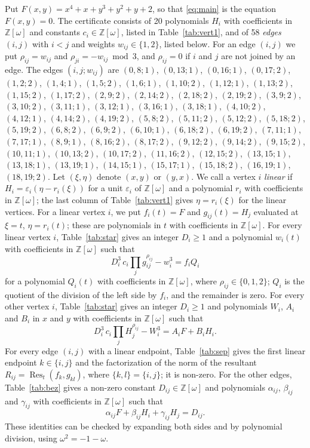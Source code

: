 \documentclass[11pt]{article}
\newcommand{\Z}{\mathbb{Z}}
\begin{document}
Put $F(x,y)=x^{4}+x+y^{3}+y^{2}+y+2$, so that \eqref{eq:main} is the equation $F(x,y)=0$. The certificate consists of 20 polynomials $H_i$ with coefficients in $\Z[\omega]$ and constants $c_i\in\Z[\omega]$, listed in Table~\ref{tab:vert1}, and of 58 \emph{edges} $(i,j)$ with $i<j$ and weights $w_{ij}\in\{1,2\}$, listed below. For an edge $(i,j)$ we put $\rho_{ij}=w_{ij}$ and $\rho_{ji}=-w_{ij}\bmod 3$, and $\rho_{ij}=0$ if $i$ and $j$ are not joined by an edge.
The edges $(i,j;w_{ij})$ are $(0,8;1)$, $(0,13;1)$, $(0,16;1)$, $(0,17;2)$, $(1,2;2)$, $(1,4;1)$, $(1,5;2)$, $(1,6;1)$, $(1,10;2)$, $(1,12;1)$, $(1,13;2)$, $(1,15;2)$, $(1,17;2)$, $(2,9;2)$, $(2,14;2)$, $(2,18;2)$, $(2,19;2)$, $(3,9;2)$, $(3,10;2)$, $(3,11;1)$, $(3,12;1)$, $(3,16;1)$, $(3,18;1)$, $(4,10;2)$, $(4,12;1)$, $(4,14;2)$, $(4,19;2)$, $(5,8;2)$, $(5,11;2)$, $(5,12;2)$, $(5,18;2)$, $(5,19;2)$, $(6,8;2)$, $(6,9;2)$, $(6,10;1)$, $(6,18;2)$, $(6,19;2)$, $(7,11;1)$, $(7,17;1)$, $(8,9;1)$, $(8,16;2)$, $(8,17;2)$, $(9,12;2)$, $(9,14;2)$, $(9,15;2)$, $(10,11;1)$, $(10,13;2)$, $(10,17;2)$, $(11,16;2)$, $(12,15;2)$, $(13,15;1)$, $(13,18;1)$, $(13,19;1)$, $(14,15;1)$, $(15,17;1)$, $(15,18;2)$, $(16,19;1)$, $(18,19;2)$.
Let $(\xi,\eta)$ denote $(x,y)$ or $(y,x)$. We call a vertex $i$ \emph{linear} if $H_i=\varepsilon_i(\eta-r_i(\xi))$ for a unit $\varepsilon_i$ of $\Z[\omega]$ and a polynomial $r_i$ with coefficients in $\Z[\omega]$; the last column of Table~\ref{tab:vert1} gives $\eta=r_i(\xi)$ for the linear vertices. For a linear vertex $i$, we put $f_i(t)=F$ and $g_{ij}(t)=H_j$ evaluated at $\xi=t$, $\eta=r_i(t)$; these are polynomials in $t$ with coefficients in $\Z[\omega]$.
For every linear vertex $i$, Table~\ref{tab:star} gives an integer $D_i\geq1$ and a polynomial $w_i(t)$ with coefficients in $\Z[\omega]$ such that
\begin{equation}\label{eq:starlin}
D_i^3\,c_i\prod_jg_{ij}^{\rho_{ij}}-w_i^3=f_iQ_i
\end{equation}
for a polynomial $Q_i(t)$ with coefficients in $\Z[\omega]$, where $\rho_{ij}\in\{0,1,2\}$; $Q_i$ is the quotient of the division of the left side by $f_i$, and the remainder is zero.
For every other vertex $i$, Table~\ref{tab:star} gives an integer $D_i\geq1$ and polynomials $W_i$, $A_i$ and $B_i$ in $x$ and $y$ with coefficients in $\Z[\omega]$ such that
\begin{equation}\label{eq:star}
D_i^3\,c_i\prod_jH_j^{\rho_{ij}}-W_i^3=A_iF+B_iH_i.
\end{equation}
For every edge $(i,j)$ with a linear endpoint, Table~\ref{tab:sep} gives the first linear endpoint $k\in\{i,j\}$ and the factorization of the norm of the resultant $R_{ij}=\operatorname{Res}_t(f_k,g_{kl})$, where $\{k,l\}=\{i,j\}$; it is non-zero.
For the other edges, Table~\ref{tab:bez} gives a non-zero constant $D_{ij}\in\Z[\omega]$ and polynomials $\alpha_{ij}$, $\beta_{ij}$ and $\gamma_{ij}$ with coefficients in $\Z[\omega]$ such that
\begin{equation}\label{eq:sep}
\alpha_{ij}F+\beta_{ij}H_i+\gamma_{ij}H_j=D_{ij}.
\end{equation}
These identities can be checked by expanding both sides and by polynomial division, using $\omega^2=-1-\omega$.
\end{document}
